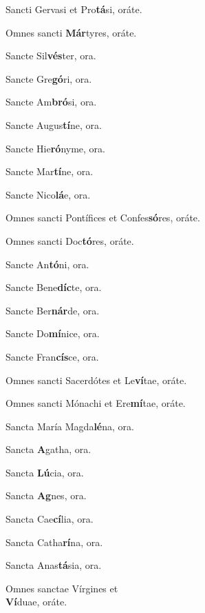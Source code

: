 \begin{multicols}{2}
\begin{hangparas}{1em}{1}
Sancti Gervasi et Pro\textbf{tá}si,
\hfill \mbox{oráte.}

Omnes sancti \textbf{Már}tyres,
\hfill \mbox{oráte.}

Sancte Sil\textbf{vés}ter,
\hfill \mbox{ora.}

Sancte Gre\textbf{gó}ri,
\hfill \mbox{ora.}

Sancte Am\textbf{bró}si,
\hfill \mbox{ora.}

Sancte Augus\textbf{tí}ne,
\hfill \mbox{ora.}

Sancte Hie\textbf{ró}nyme,
\hfill \mbox{ora.}

Sancte Mar\textbf{tí}ne,
\hfill \mbox{ora.}

Sancte Nico\textbf{lá}e,
\hfill \mbox{ora.}

Omnes sancti Pontífices et Confes\textbf{só}res,
\hfill \mbox{oráte.}

Omnes sancti Doc\textbf{tó}res,
\hfill \mbox{oráte.}

Sancte An\textbf{tó}ni,
\hfill \mbox{ora.}

Sancte Bene\textbf{díc}te,
\hfill \mbox{ora.}

Sancte Ber\textbf{nár}de,
\hfill \mbox{ora.}

Sancte Do\textbf{mí}nice,
\hfill \mbox{ora.}

Sancte Fran\textbf{cís}ce,
\hfill \mbox{ora.}

Omnes sancti Sacerdótes et Le\textbf{ví}tae,
\hfill \mbox{oráte.}

Omnes sancti Mónachi et Ere\textbf{mí}tae,
\hfill \mbox{oráte.}

Sancta María Magda\textbf{lé}na,
\hfill \mbox{ora.}

Sancta \textbf{A}gatha,
\hfill \mbox{ora.}

Sancta \textbf{Lú}cia,
\hfill \mbox{ora.}

Sancta \textbf{Ag}nes,
\hfill \mbox{ora.}

Sancta Cae\textbf{cí}lia,
\hfill \mbox{ora.}

Sancta Catha\textbf{rí}na,
\hfill \mbox{ora.}

Sancta Anas\textbf{tá}sia,
\hfill \mbox{ora.}

Omnes sanctae Vírgines et\\
\quad \textbf{Ví}duae, \hfill \mbox{oráte.}



\end{hangparas}
\end{multicols}

